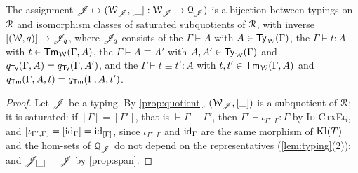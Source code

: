 \begin{proposition}\label{prop:characterisation}
    The assignment $\mathscr{J} \mapsto (\mathcal{W}_{\mathscr{J}}, [\_] : \mathcal{W}_{\mathscr{J}} \to \mathcal{Q}_{\mathscr{J}})$ is a bijection between typings on $\mathcal{R}$ and isomorphism classes of saturated subquotients of $\mathcal{R}$, with inverse $[(\mathcal{W}, q)] \mapsto \mathscr{J}_q$, where $\mathscr{J}_q$ consists of the $\Gamma \vdash A$ with $A \in \mathsf{Ty}_{\mathcal{W}}(\Gamma)$, the $\Gamma \vdash t : A$ with $t \in \mathsf{Tm}_{\mathcal{W}}(\Gamma, A)$, the $\Gamma \vdash A \equiv A'$ with $A, A' \in \mathsf{Ty}_{\mathcal{W}}(\Gamma)$ and $q_{\mathsf{Ty}}(\Gamma, A) = q_{\mathsf{Ty}}(\Gamma, A')$, and the $\Gamma \vdash t \equiv t' : A$ with $t, t' \in \mathsf{Tm}_{\mathcal{W}}(\Gamma, A)$ and $q_{\mathsf{Tm}}(\Gamma, A, t) = q_{\mathsf{Tm}}(\Gamma, A, t')$.
\end{proposition}

\begin{proof}
    Let $\mathscr{J}$ be a typing. By \cref{prop:quotient}, $(\mathcal{W}_{\mathscr{J}}, [\_])$ is a subquotient of $\mathcal{R}$; it is saturated: if $[\Gamma] = [\Gamma']$, that is $\vdash \Gamma \equiv \Gamma'$, then $\Gamma' \vdash \iota_{\Gamma', \Gamma} : \Gamma$ by \textsc{Id-CtxEq}, and $[\iota_{\Gamma', \Gamma}] = [\mathrm{id}_\Gamma] = \mathrm{id}_{[\Gamma]}$, since $\iota_{\Gamma', \Gamma}$ and $\mathrm{id}_\Gamma$ are the same morphism of $\mathrm{Kl}(T)$ and the hom-sets of $\mathcal{Q}_{\mathscr{J}}$ do not depend on the representatives (\cref{lem:typing}(2)); and $\mathscr{J}_{[\_]} = \mathscr{J}$ by \cref{prop:span}.


\end{proof}
